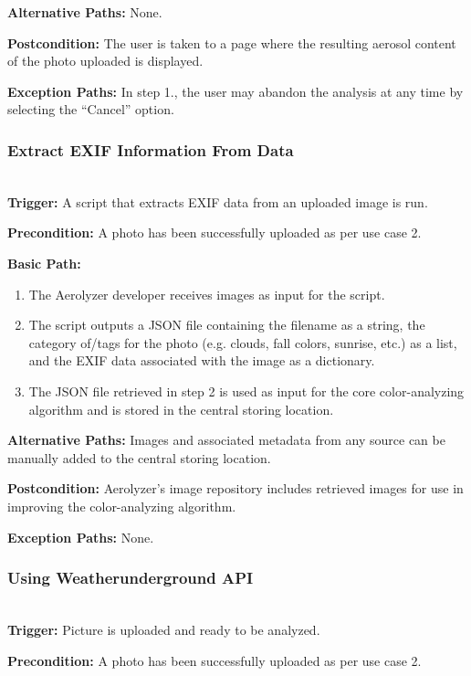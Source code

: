 \documentclass[letterpaper,10pt,draftclsnofoot,onecolumn]{IEEEtran}
\begin{document}
\begin{flushleft}
\textbf{Alternative Paths: }
None.

\textbf{Postcondition: }
The user is taken to a page where the resulting aerosol content of the photo uploaded is displayed.

\textbf{Exception Paths: }
In step 1., the user may abandon the analysis at any time by selecting the “Cancel” option. 
\bigskip

\subsubsection{Extract EXIF Information From Data}  \ \\

\textbf{Trigger: } 
A script that extracts EXIF data from an uploaded image is run.

\textbf{Precondition: }
A photo has been successfully uploaded as per use case 2.

\textbf{Basic Path: }
\begin{enumerate}
	\item The Aerolyzer developer receives images as input for the script.
	\item The script outputs a JSON file containing the filename as a string, the category of/tags for the photo (e.g. clouds, fall colors, sunrise, etc.) as a list, and the EXIF data associated with the image as a dictionary.
	\item The JSON file retrieved in step 2 is used as input for the core color-analyzing algorithm and is stored in the central storing location.
\end{enumerate}

\textbf{Alternative Paths: }
Images and associated metadata from any source can be manually added to the central storing location.

\textbf{Postcondition: }
Aerolyzer's image repository includes retrieved images for use in improving the color-analyzing algorithm.

\textbf{Exception Paths: }
None. 
\bigskip

\subsubsection{Using Weatherunderground API}  \ \\

\textbf{Trigger: } 
Picture is uploaded and ready to be analyzed.

\textbf{Precondition: }
A photo has been successfully uploaded as per use case 2.


\end{flushleft}
\end{document}
